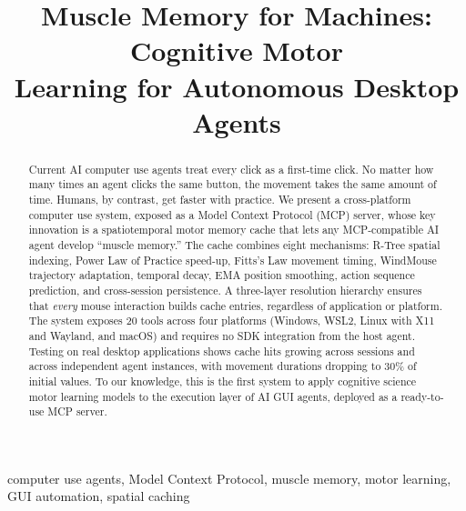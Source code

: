 \documentclass[conference]{IEEEtran}
\begin{document}
\title{Muscle Memory for Machines: Cognitive Motor\\Learning for Autonomous Desktop Agents}

\author{
}

\maketitle

\begin{abstract}
Current AI computer use agents treat every click as a first-time click. No matter how many times an agent clicks the same button, the movement takes the same amount of time. Humans, by contrast, get faster with practice. We present a cross-platform computer use system, exposed as a Model Context Protocol (MCP) server, whose key innovation is a spatiotemporal motor memory cache that lets any MCP-compatible AI agent develop ``muscle memory.'' The cache combines eight mechanisms: R-Tree spatial indexing, Power Law of Practice speed-up, Fitts's Law movement timing, WindMouse trajectory adaptation, temporal decay, EMA position smoothing, action sequence prediction, and cross-session persistence. A three-layer resolution hierarchy ensures that \emph{every} mouse interaction builds cache entries, regardless of application or platform. The system exposes 20 tools across four platforms (Windows, WSL2, Linux with X11 and Wayland, and macOS) and requires no SDK integration from the host agent. Testing on real desktop applications shows cache hits growing across sessions and across independent agent instances, with movement durations dropping to 30\% of initial values. To our knowledge, this is the first system to apply cognitive science motor learning models to the execution layer of AI GUI agents, deployed as a ready-to-use MCP server.
\end{abstract}

\begin{IEEEkeywords}
computer use agents, Model Context Protocol, muscle memory, motor learning, GUI automation, spatial caching
\end{IEEEkeywords}

\end{document}
